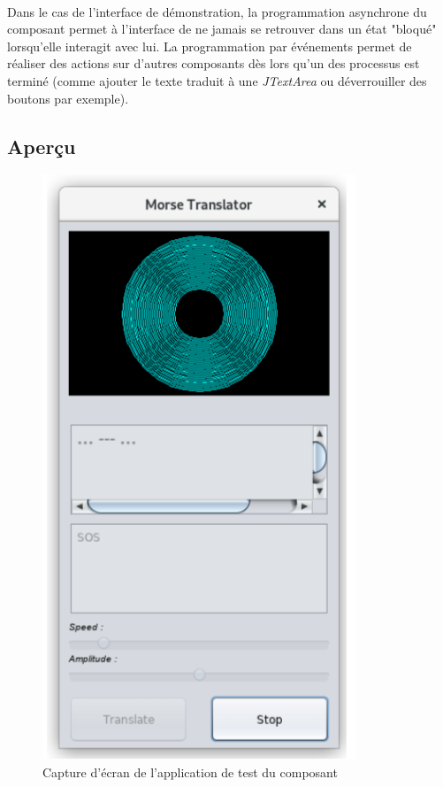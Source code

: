 \documentclass[a4paper,11pt]{article}
\begin{document}
    \paragraph{}
    Dans le cas de l'interface de démonstration, la programmation asynchrone du composant permet à l'interface de ne jamais se retrouver dans un état "bloqué" lorsqu'elle interagit avec lui. La programmation par événements permet de réaliser des actions sur d'autres composants dès lors qu'un des processus est terminé (comme ajouter le texte traduit à une \textit{JTextArea} ou déverrouiller des boutons par exemple).


    \subsection{Aperçu}
    \begin{figure}[H]
        \begin{center}
            \includegraphics[scale=0.7]{descpicture.png}
            \caption{Capture d'écran de l'application de test du composant}
            \label{Capture d'écran de l'application de test du composant}
        \end{center}
    \end{figure}
\end{document}
